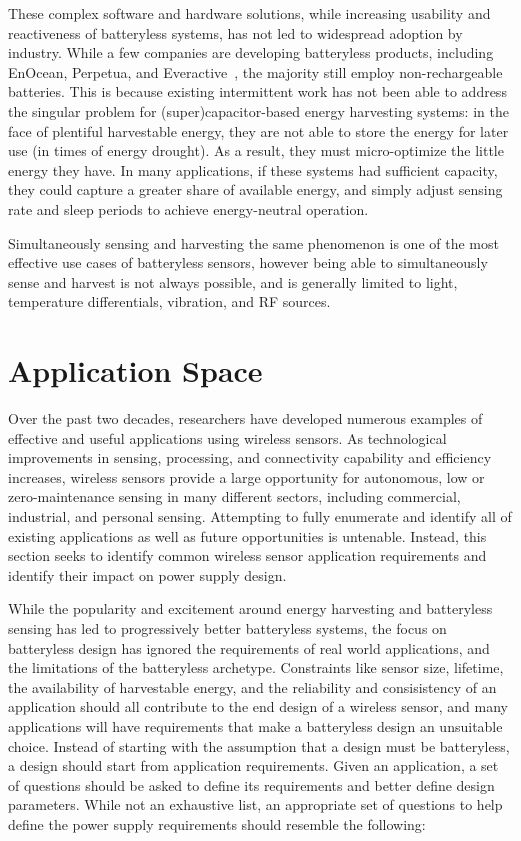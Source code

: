 These complex software and hardware solutions, while increasing usability and reactiveness of batteryless systems, has not led to widespread adoption by industry. 
While a few companies are developing batteryless products, including EnOcean, Perpetua, and Everactive~\cite{enocean, perpetua, everactive}, the majority still employ non-rechargeable batteries.
This is because existing intermittent work has not been able to address the singular problem for (super)capacitor-based energy
harvesting systems: in the face of plentiful harvestable energy, they are not
able to store the energy for later use (in times of energy drought).
As a result, they must
micro-optimize the little energy they have. 
In many applications, if these
systems had sufficient capacity, they could capture a greater share of available energy, and simply adjust sensing rate and
sleep periods to achieve energy-neutral operation. 

Simultaneously sensing and harvesting the same phenomenon is one of the most effective use cases of batteryless sensors, however being able to simultaneously sense and harvest is not always possible, and is generally limited to light, temperature differentials, vibration, and RF sources. 

\section{Application Space}
Over the past two decades, researchers have developed numerous examples of effective and useful applications using wireless sensors.
As technological improvements in sensing, processing, and connectivity capability and efficiency increases, wireless sensors provide a large opportunity for autonomous, low or zero-maintenance sensing in many different sectors, including commercial, industrial, and personal sensing. 
Attempting to fully enumerate and identify all of existing applications as well as future opportunities is untenable.
Instead, this section seeks to identify common wireless sensor application requirements and identify their impact on power supply design.  

While the popularity and excitement around energy harvesting and batteryless sensing has led to progressively better batteryless systems, the focus on batteryless design has ignored the requirements of real world applications, and the limitations of the batteryless archetype. 
Constraints like sensor size, lifetime, the availability of harvestable energy, and the reliability and consisistency of an application should all contribute to the end design of a wireless sensor, and many applications will have requirements that make a batteryless design an unsuitable choice.
Instead of starting with the assumption that a design must be batteryless, a design should start from application requirements. Given an application, a set of questions should be asked to define its requirements and better define design parameters.
While not an exhaustive list, an appropriate set of questions to help define the power supply requirements should resemble the following:

